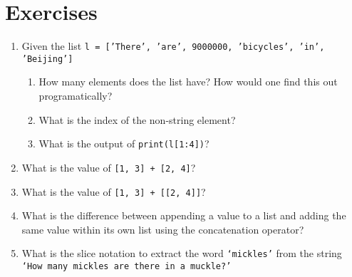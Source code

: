 \section{Exercises}

\begin{enumerate}
\item Given the list 
\texttt{l = ['There', 'are', 9000000, 'bicycles', 'in', 'Beijing']}
\begin{enumerate}
	\item How many elements does the list have? How would one find this    out programatically?
	\item What is the index of the non-string element?
	\item What is the output of 
\texttt{print(l[1:4])}?
\end{enumerate}
	\item What is the value of 
\texttt{[1, 3] + [2, 4]}?
	\item What is the value of 
\texttt{[1, 3] + [[2, 4]]}?
	\item What is the difference between appending a value to a list and    adding the same value within its own list using the concatenation    operator?
	\item What is the slice notation to extract the word \texttt{`mickles'} from    the string \texttt{`How many mickles are there in a    muckle?'}
% 
% 
% 
% 


\end{enumerate}
